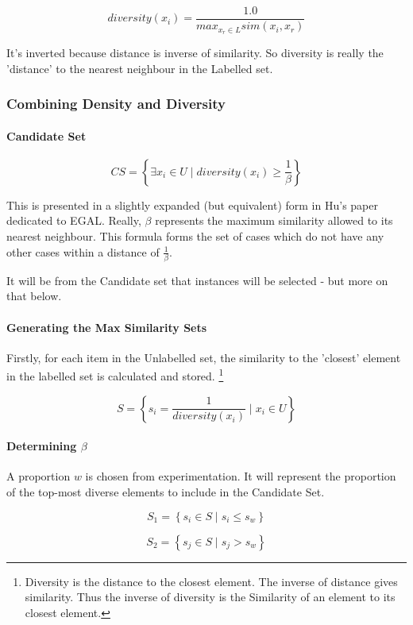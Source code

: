 \documentclass[a4paper,11pt]{report}
\begin{document}
\[
diversity(x_{i})=\frac{1.0}{max_{x_{r}\in L}sim(x_{i},x_{r})}
\]

It's inverted because distance is inverse of similarity. So diversity is really the 'distance' to the nearest neighbour in the Labelled set.

\subsubsection{Combining Density and Diversity}

\paragraph{Candidate Set}
\[
CS=\left\{ \exists x_{i}\in U\mid diversity(x_{i})\geq\frac{1}{\beta}\right\} 
\]

This is presented in a slightly expanded (but equivalent) form in Hu's paper dedicated to EGAL\cite{Hu2010}. Really, $\beta$ represents the maximum similarity allowed to its nearest neighbour. This formula forms the set of cases which do not have any other cases within a distance of $\frac{1}{\beta}$.

It will be from the Candidate set that instances will be selected - but more on that below.

\paragraph{Generating the Max Similarity Sets}

Firstly, for each item in the Unlabelled set, the similarity to the 'closest' element in the labelled set is calculated and stored. \footnote{Diversity is the distance to the closest element. The inverse of distance gives similarity. Thus the inverse of diversity is the Similarity of an element to its closest element.}

\[
S=\left\{ s_{i}=\frac{1}{diversity(x_{i})}\mid x_{i}\in U\right\} 
\]

\paragraph{Determining $\beta$}
A proportion $w$ is chosen from experimentation. It will represent the proportion of the top-most diverse elements to include in the Candidate Set.

\[
S_{1}=\left\{ s_{i}\in S\mid s_{i}\leq s_{w}\right\} 
\]

\[
S_{2}=\left\{ s_{j}\in S\mid s_{j}>s_{w}\right\} 
\]
\end{document}
